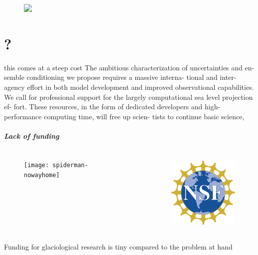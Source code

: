 \documentclass[hide notes,intlimits]{beamer}
\begin{document}
\begin{frame}
  \begin{figure}
    \includegraphics<1->[height=8cm]{sle_pdf_w_obs_2020_2100}
  \end{figure}
\end{frame}

\part{?}
\frame{\partpage}


\begin{frame}{this comes at a steep cost}
The ambitious characterization of uncertainties and en- semble conditioning we propose requires a massive interna- tional and inter-agency effort in both model development and improved observational capabilities. We call for professional support for the largely computational sea level projection ef- fort. These resources, in the form of dedicated developers and high-performance computing time, will free up scien- tists to continue basic science,
\end{frame}


\begin{frame}
 \frametitle{Lack of funding}
  \begin{columns}[c]
    \begin{column}{.5\linewidth}
      \begin{figure}
        \texttt{[image: spiderman-nowayhome]}
      \end{figure}
    \end{column}
    \begin{column}{.5\linewidth}
      \begin{figure}
        \includegraphics[height=3.5cm]{nsf_logo_color}
      \end{figure}
    \end{column}
\end{columns}
\end{frame}


\begin{frame}
Funding for glaciological research is tiny compared to the problem at hand
\end{frame}
\end{document}

